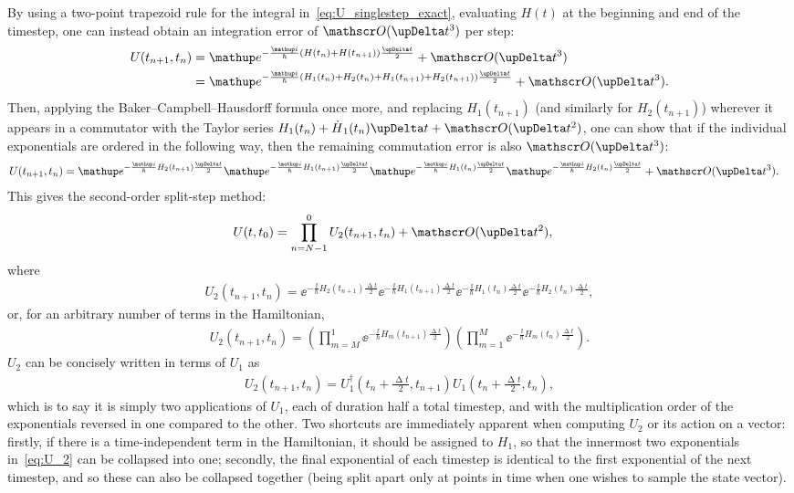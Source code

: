 By using a two-point trapezoid rule for the integral in~\eqref{eq:U_singlestep_exact}, evaluating $H(t)$ at the beginning and end of the timestep, one can instead obtain an integration error of $\Ord{\upDelta t^3}$ per step:
\begin{align}
U(t_{n+1}, t_n) &= \ee^{-\frac \ii \hbar \left(H(t_n) + H(t_{n+1})\right)\frac{\upDelta t} 2} + \Ord{\upDelta t^3}\\
&= \ee^{-\frac \ii \hbar \left(H_1(t_n) + H_2(t_n) + H_1(t_{n+1}) + H_2(t_{n+1})\right)\frac{\upDelta t} 2} + \Ord{\upDelta t^3}.
\end{align}
Then, applying the Baker--Campbell--Hausdorff formula once more, and replacing $H_1(t_{n+1})$ (and similarly for $H_2(t_{n+1})$) wherever it appears in a commutator with the Taylor series $H_1(t_n) + \dot H_1(t_n)\upDelta t + \Ord{\upDelta t^2}$, one can show that if the individual exponentials are ordered in the following way, then the remaining commutation error is also $\Ord{\upDelta t^3}$:
\begin{align}
U(t_{n+1}, t_n)
&= \ee^{-\frac \ii \hbar H_2(t_{n+1})\frac{\upDelta t} 2}
   \ee^{-\frac \ii \hbar H_1(t_{n+1})\frac{\upDelta t} 2}
   \ee^{-\frac \ii \hbar H_1(t_n)\frac{\upDelta t} 2}
   \ee^{-\frac \ii \hbar H_2(t_n)\frac{\upDelta t} 2} + \Ord{\upDelta t^3}.
\end{align}
This gives the second-order split-step method:
\begin{align}
U(t, t_0) &= \prod_{n=N-1}^0 U_2(t_{n+1}, t_n) + \Ord{\upDelta t^2},
\end{align}
where
\begin{align}\label{eq:U_2}
U_2(t_{n+1}, t_n) =
   \ee^{-\frac \ii \hbar H_2(t_{n+1})\frac{\upDelta t} 2}
   \ee^{-\frac \ii \hbar H_1(t_{n+1})\frac{\upDelta t} 2}
   \ee^{-\frac \ii \hbar H_1(t_n)\frac{\upDelta t} 2}
   \ee^{-\frac \ii \hbar H_2(t_n)\frac{\upDelta t} 2},
\end{align}
or, for an arbitrary number of terms in the Hamiltonian,
\begin{align}\label{eq:U_2_arbitrary_terms}
U_2(t_{n+1}, t_n) =
\left(\prod_{m=M}^1 \ee^{-\frac \ii \hbar H_m(t_{n+1})\frac{\upDelta t} 2}\right)
\left(\prod_{m=1}^M \ee^{-\frac \ii \hbar H_m(t_n)\frac{\upDelta t} 2}\right).
\end{align}
$U_2$ can be concisely written in terms of $U_1$ as
\begin{align}
U_2(t_{n+1}, t_n) =
U_1^\dagger(t_n + \tfrac {\upDelta t} 2, t_{n+1})
U_1(t_n + \tfrac {\upDelta t} 2, t_n),
\end{align}
which is to say it is simply two applications of $U_1$, each of duration half a total timestep, and with the multiplication order of the exponentials reversed in one compared to the other. Two shortcuts are immediately apparent when computing $U_2$ or its action on a vector: firstly, if there is a time-independent term in the Hamiltonian, it should be assigned to $H_1$, so that the innermost two exponentials in~\eqref{eq:U_2} can be collapsed into one; secondly, the final exponential of each timestep is identical to the first exponential of the next timestep, and so these can also be collapsed together (being split apart only at points in time when one wishes to sample the state vector).

